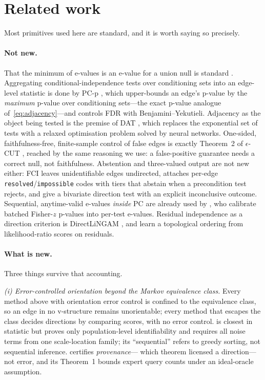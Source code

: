 \documentclass[11pt,a4paper]{article}
\theoremstyle{definition}
\theoremstyle{remark}
\begin{document}
\section{Related work}
\label{sec:related}

Most primitives used here are standard, and it is worth saying so precisely.

\paragraph{Not new.} That the minimum of e-values is an e-value for a union null
is standard \citep{vovk2021evalues}. Aggregating conditional-independence tests
over conditioning sets into an edge-level statistic is done by PC-p
\citep{strobl2017estimating}, which upper-bounds an edge's p-value by the
\emph{maximum} p-value over conditioning sets---the exact p-value analogue
of~\eqref{eq:adjacency}---and controls FDR with Benjamini--Yekutieli. Adjacency
as the object being tested is the premise of DAT \citep{amin2024scalable}, which
replaces the exponential set of tests with a relaxed optimisation problem solved
by neural networks. One-sided, faithfulness-free, finite-sample control of false
edges is exactly Theorem~2 of $\epsilon$-CUT \citep{shaska2025causal}, reached by
the same reasoning we use: a false-positive guarantee needs a correct null, not
faithfulness. Abstention and three-valued output are not new either: FCI leaves
unidentifiable edges undirected, \citet{uehara2026iterative} attaches per-edge
\texttt{resolved}/\texttt{impossible} codes with tiers that abstain when a
precondition test rejects, and \citet{prakash2024diagnostic} give a bivariate
direction test with an explicit inconclusive outcome. Sequential, anytime-valid
e-values \emph{inside} PC are already used by \citet{csillag2025prediction}, who
calibrate batched Fisher-$z$ p-values into per-test e-values. Residual
independence as a direction criterion is DirectLiNGAM
\citep{shimizu2011directlingam}, and \citet{ruiz2022sequentially} learn a
topological ordering from likelihood-ratio scores on residuals.

\paragraph{What is new.} Three things survive that accounting.

\emph{(i) Error-controlled orientation beyond the Markov equivalence class.}
Every method above with orientation error control is confined to the equivalence
class, so an edge in no v-structure remains unorientable; every method that
escapes the class decides directions by comparing scores, with no error control.
\citet{ruiz2022sequentially} is closest in statistic but proves only
population-level identifiability and requires all noise terms from one
scale-location family; its ``sequential'' refers to greedy sorting, not
sequential inference. \citet{uehara2026iterative} certifies \emph{provenance}---
which theorem licensed a direction---not error, and its Theorem~1 bounds expert
query counts under an ideal-oracle assumption.
\end{document}
